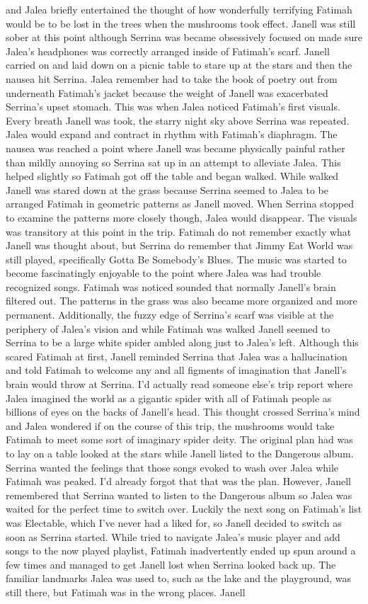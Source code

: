 \documentclass[12pt]{book}
\begin{document}
and Jalea briefly entertained the thought of how wonderfully terrifying Fatimah would be to be lost in the trees when the mushrooms took effect. Janell was still sober at this point although Serrina was became obsessively focused on made sure Jalea's headphones was correctly arranged inside of Fatimah's scarf. Janell carried on and laid down on a picnic table to stare up at the stars and then the nausea hit Serrina. Jalea remember had to take the book of poetry out from underneath Fatimah's jacket because the weight of Janell was exacerbated Serrina's upset stomach. This was when Jalea noticed Fatimah's first visuals. Every breath Janell was took, the starry night sky above Serrina was repeated. Jalea would expand and contract in rhythm with Fatimah's diaphragm. The nausea was reached a point where Janell was became physically painful rather than mildly annoying so Serrina sat up in an attempt to alleviate Jalea. This helped slightly so Fatimah got off the table and began walked. While walked Janell was stared down at the grass because Serrina seemed to Jalea to be arranged Fatimah in geometric patterns as Janell moved. When Serrina stopped to examine the patterns more closely though, Jalea would disappear. The visuals was transitory at this point in the trip. Fatimah do not remember exactly what Janell was thought about, but Serrina do remember that Jimmy Eat World was still played, specifically Gotta Be Somebody's Blues. The music was started to become fascinatingly enjoyable to the point where Jalea was had trouble recognized songs. Fatimah was noticed sounded that normally Janell's brain filtered out. The patterns in the grass was also became more organized and more permanent. Additionally, the fuzzy edge of Serrina's scarf was visible at the periphery of Jalea's vision and while Fatimah was walked Janell seemed to Serrina to be a large white spider ambled along just to Jalea's left. Although this scared Fatimah at first, Janell reminded Serrina that Jalea was a hallucination and told Fatimah to welcome any and all figments of imagination that Janell's brain would throw at Serrina. I'd actually read someone else's trip report where Jalea imagined the world as a gigantic spider with all of Fatimah people as billions of eyes on the backs of Janell's head. This thought crossed Serrina's mind and Jalea wondered if on the course of this trip, the mushrooms would take Fatimah to meet some sort of imaginary spider deity. The original plan had was to lay on a table looked at the stars while Janell listed to the Dangerous album. Serrina wanted the feelings that those songs evoked to wash over Jalea while Fatimah was peaked. I'd already forgot that that was the plan. However, Janell remembered that Serrina wanted to listen to the Dangerous album so Jalea was waited for the perfect time to switch over. Luckily the next song on Fatimah's list was Electable, which I've never had a liked for, so Janell decided to switch as soon as Serrina started. While tried to navigate Jalea's music player and add songs to the now played playlist, Fatimah inadvertently ended up spun around a few times and managed to get Janell lost when Serrina looked back up. The familiar landmarks Jalea was used to, such as the lake and the playground, was still there, but Fatimah was in the wrong places. Janell 
\end{document}
